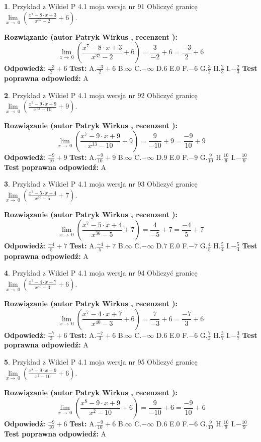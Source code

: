 \documentclass[12pt, a4paper]{article}
\theoremstyle{definition} %
\newtheorem{zad}{}
\newcommand{\zadStart}[1]{\begin{zad}#1\newline}
\newcommand{\zadStop}{\end{zad}}
\newcommand{\rozwStart}[2]{\noindent \textbf{Rozwiązanie (autor #1 , recenzent #2): }\newline}
\newcommand{\rozwStop}{\newline}
\newcommand{\odpStart}{\noindent \textbf{Odpowiedź:}\newline}
\newcommand{\odpStop}{\newline}
\newcommand{\testStart}{\noindent \textbf{Test:}\newline}
\newcommand{\testStop}{\newline}
\newcommand{\kluczStart}{\noindent \textbf{Test poprawna odpowiedź:}\newline}
\newcommand{\kluczStop}{\newline}
\begin{document}
\zadStart{Przykład z Wikieł P 4.1 moja wersja nr 91}
Obliczyć granicę $\lim\limits_{x\to\ 0}(\frac{x^{7}-8 \cdot x +3}{x^{32}-2}+6)$.
\zadStop
\rozwStart{Patryk Wirkus}{}
$$\lim\limits_{x\to\ 0}(\frac{x^{7}-8 \cdot x +3}{x^{32}-2}+6)=\frac{3}{-2}+6=\frac{-3}{2}+6$$
\rozwStop
\odpStart
$\frac{-3}{2}+6$
\odpStop
\testStart
A.$\frac{-3}{2}+6$
B.$\infty$
C.$-\infty$
D.$6$
E.$0$
F.$-6$
G.$\frac{3}{2}$
H.$\frac{2}{3}$
I.$-\frac{2}{3}$
\testStop
\kluczStart
A
\kluczStop



\zadStart{Przykład z Wikieł P 4.1 moja wersja nr 92}
Obliczyć granicę $\lim\limits_{x\to\ 0}(\frac{x^{7}-9 \cdot x +9}{x^{33}-10}+9)$.
\zadStop
\rozwStart{Patryk Wirkus}{}
$$\lim\limits_{x\to\ 0}(\frac{x^{7}-9 \cdot x +9}{x^{33}-10}+9)=\frac{9}{-10}+9=\frac{-9}{10}+9$$
\rozwStop
\odpStart
$\frac{-9}{10}+9$
\odpStop
\testStart
A.$\frac{-9}{10}+9$
B.$\infty$
C.$-\infty$
D.$9$
E.$0$
F.$-9$
G.$\frac{9}{10}$
H.$\frac{10}{9}$
I.$-\frac{10}{9}$
\testStop
\kluczStart
A
\kluczStop



\zadStart{Przykład z Wikieł P 4.1 moja wersja nr 93}
Obliczyć granicę $\lim\limits_{x\to\ 0}(\frac{x^{7}-5 \cdot x +4}{x^{36}-5}+7)$.
\zadStop
\rozwStart{Patryk Wirkus}{}
$$\lim\limits_{x\to\ 0}(\frac{x^{7}-5 \cdot x +4}{x^{36}-5}+7)=\frac{4}{-5}+7=\frac{-4}{5}+7$$
\rozwStop
\odpStart
$\frac{-4}{5}+7$
\odpStop
\testStart
A.$\frac{-4}{5}+7$
B.$\infty$
C.$-\infty$
D.$7$
E.$0$
F.$-7$
G.$\frac{4}{5}$
H.$\frac{5}{4}$
I.$-\frac{5}{4}$
\testStop
\kluczStart
A
\kluczStop



\zadStart{Przykład z Wikieł P 4.1 moja wersja nr 94}
Obliczyć granicę $\lim\limits_{x\to\ 0}(\frac{x^{7}-4 \cdot x +7}{x^{40}-3}+6)$.
\zadStop
\rozwStart{Patryk Wirkus}{}
$$\lim\limits_{x\to\ 0}(\frac{x^{7}-4 \cdot x +7}{x^{40}-3}+6)=\frac{7}{-3}+6=\frac{-7}{3}+6$$
\rozwStop
\odpStart
$\frac{-7}{3}+6$
\odpStop
\testStart
A.$\frac{-7}{3}+6$
B.$\infty$
C.$-\infty$
D.$6$
E.$0$
F.$-6$
G.$\frac{7}{3}$
H.$\frac{3}{7}$
I.$-\frac{3}{7}$
\testStop
\kluczStart
A
\kluczStop



\zadStart{Przykład z Wikieł P 4.1 moja wersja nr 95}
Obliczyć granicę $\lim\limits_{x\to\ 0}(\frac{x^{8}-9 \cdot x +9}{x^{2}-10}+6)$.
\zadStop
\rozwStart{Patryk Wirkus}{}
$$\lim\limits_{x\to\ 0}(\frac{x^{8}-9 \cdot x +9}{x^{2}-10}+6)=\frac{9}{-10}+6=\frac{-9}{10}+6$$
\rozwStop
\odpStart
$\frac{-9}{10}+6$
\odpStop
\testStart
A.$\frac{-9}{10}+6$
B.$\infty$
C.$-\infty$
D.$6$
E.$0$
F.$-6$
G.$\frac{9}{10}$
H.$\frac{10}{9}$
I.$-\frac{10}{9}$
\testStop
\kluczStart
A
\kluczStop
\end{document}
